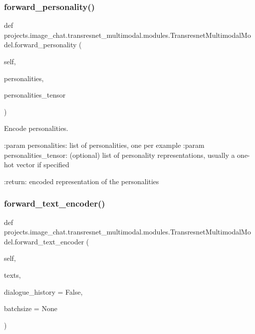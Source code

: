 \subsubsection{\texorpdfstring{forward\+\_\+personality()}{forward\_personality()}}
{\footnotesize\ttfamily def projects.\+image\+\_\+chat.\+transresnet\+\_\+multimodal.\+modules.\+Transresnet\+Multimodal\+Model.\+forward\+\_\+personality (\begin{DoxyParamCaption}\item[{}]{self,  }\item[{}]{personalities,  }\item[{}]{personalities\+\_\+tensor }\end{DoxyParamCaption})}

\begin{DoxyVerb}Encode personalities.

:param personalities:
    list of personalities, one per example
:param personalities_tensor:
    (optional) list of personality representations, usually a one-hot
    vector if specified

:return:
    encoded representation of the personalities
\end{DoxyVerb}
 \mbox{\label{classprojects_1_1image__chat_1_1transresnet__multimodal_1_1modules_1_1TransresnetMultimodalModel_a0dbaa08f20aed129c58237d8d7575197}} 
\subsubsection{\texorpdfstring{forward\+\_\+text\+\_\+encoder()}{forward\_text\_encoder()}}
{\footnotesize\ttfamily def projects.\+image\+\_\+chat.\+transresnet\+\_\+multimodal.\+modules.\+Transresnet\+Multimodal\+Model.\+forward\+\_\+text\+\_\+encoder (\begin{DoxyParamCaption}\item[{}]{self,  }\item[{}]{texts,  }\item[{}]{dialogue\+\_\+history = {\ttfamily False},  }\item[{}]{batchsize = {\ttfamily None} }\end{DoxyParamCaption})}

